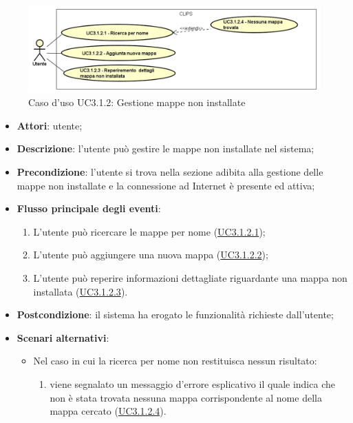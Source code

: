 \documentclass[../AnalisiDeiRequisiti.tex]{subfiles}
\begin{document}
\begin{figure}[H]
	\centering
	\includegraphics[scale=0.95, width=\textwidth]{img/UC3-1-2.png}
	\caption{Caso d'uso UC3.1.2: Gestione mappe non installate}\label{fig:UC3.1.2} 
\end{figure}
\begin{itemize}
	\item \textbf{Attori}: utente;
	\item \textbf{Descrizione}: l'utente può gestire le mappe non installate nel sistema; 
	\item \textbf{Precondizione}: l'utente si trova nella sezione adibita alla gestione delle mappe non installate e la connessione ad Internet è presente ed attiva;
	
	\item \textbf{Flusso principale degli eventi}:
	\begin{enumerate}
		\item L'utente può ricercare le mappe per nome (\hyperlink{UC3.1.2.1}{UC3.1.2.1});
		\item L'utente può aggiungere una nuova mappa (\hyperlink{UC3.1.2.2}{UC3.1.2.2});
		\item L'utente può reperire informazioni dettagliate riguardante una mappa non installata (\hyperlink{UC3.1.2.3}{UC3.1.2.3}).
		
	\end{enumerate}
	\item \textbf{Postcondizione}: il sistema ha erogato le funzionalità richieste dall'utente;
	\item \textbf{Scenari alternativi}: 
	\begin{itemize}
		\item Nel caso in cui la ricerca per nome non restituisca nessun risultato: 
		\begin{enumerate}
			\item viene segnalato un messaggio d'errore esplicativo il quale indica che non è stata trovata nessuna mappa corrispondente al nome della mappa cercato (\hyperlink{UC3.1.2.4}{UC3.1.2.4}).
		\end{enumerate}
	\end{itemize}
\end{itemize}
\hypertarget{UC3.1.2.1}{}
\end{document}
